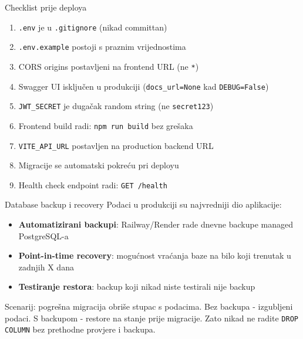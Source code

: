 \begin{frame}{Checklist prije deploya}
\begin{enumerate}
  \item \texttt{.env} je u \texttt{.gitignore} (nikad committan)
  \item \texttt{.env.example} postoji s praznim vrijednostima
  \item CORS origins postavljeni na frontend URL (ne \texttt{*})
  \item Swagger UI isključen u produkciji (\texttt{docs\_url=None} kad \texttt{DEBUG=False})
  \item \texttt{JWT\_SECRET} je dugačak random string (ne \texttt{secret123})
  \item Frontend build radi: \texttt{npm run build} bez grešaka
  \item \texttt{VITE\_API\_URL} postavljen na production backend URL
  \item Migracije se automatski pokreću pri deployu
  \item Health check endpoint radi: \texttt{GET /health}
\end{enumerate}
\end{frame}

\begin{frame}{Database backup i recovery}
Podaci u produkciji su najvredniji dio aplikacije:

\vspace{0.4em}
\begin{itemize}
  \item \textbf{Automatizirani backupi}: Railway/Render rade dnevne backupe managed PostgreSQL-a
  \item \textbf{Point-in-time recovery}: mogućnost vraćanja baze na bilo koji trenutak u zadnjih X dana
  \item \textbf{Testiranje restora}: backup koji nikad niste testirali nije backup
\end{itemize}

\vspace{0.6em}
Scenarij: pogrešna migracija obriše stupac s podacima. Bez backupa - izgubljeni podaci. S backupom - restore na stanje prije migracije. Zato nikad ne radite \texttt{DROP COLUMN} bez prethodne provjere i backupa.
\end{frame}

